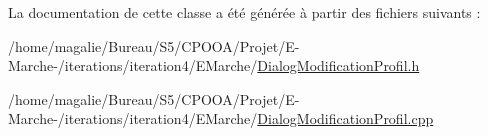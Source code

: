 La documentation de cette classe a été générée à partir des fichiers suivants \-:\begin{DoxyCompactItemize}
\item 
/home/magalie/\-Bureau/\-S5/\-C\-P\-O\-O\-A/\-Projet/\-E-\/\-Marche-\//iterations/iteration4/\-E\-Marche/\hyperlink{_dialog_modification_profil_8h}{Dialog\-Modification\-Profil.\-h}\item 
/home/magalie/\-Bureau/\-S5/\-C\-P\-O\-O\-A/\-Projet/\-E-\/\-Marche-\//iterations/iteration4/\-E\-Marche/\hyperlink{_dialog_modification_profil_8cpp}{Dialog\-Modification\-Profil.\-cpp}\end{DoxyCompactItemize}
